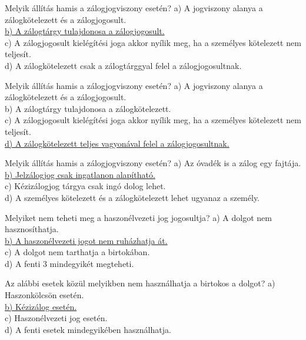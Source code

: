 \begin{frame}

\begin{tcolorbox}[title={125. Kérdés}]
Melyik állítás hamis a zálogjogviszony esetén?
\tcblower
a) A jogviszony alanya a zálogkötelezett és a zálogjogosult.\\
\uline {b) A zálogtárgy tulajdonosa a zálogjogosult.}\\
c) A zálogjogosult kielégítési joga akkor nyílik meg, ha a személyes kötelezett nem teljesít. \\
d) A zálogkötelezett csak a zálogtárggyal felel a zálogjogosultnak. 
\end{tcolorbox}

\begin{tcolorbox}[title={126. Kérdés}]
Melyik állítás hamis a zálogjogviszony esetén?
\tcblower
a) A jogviszony alanya a zálogkötelezett és a zálogjogosult.\\
b) A zálogtárgy tulajdonosa a zálogkötelezett.\\
c) A zálogjogosult kielégítési joga akkor nyílik meg, ha a személyes kötelezett nem teljesít. \\
\uline {d) A zálogkötelezett teljes vagyonával felel a zálogjogosultnak. }
\end{tcolorbox}

\begin{tcolorbox}[title={127. Kérdés}]
Melyik állítás hamis a zálogjogviszony esetén?
\tcblower
a) Az óvadék is a zálog egy fajtája.\\
\uline {b) Jelzálogjog csak ingatlanon alapítható.}\\
c) Kézizálogjog tárgya csak ingó dolog lehet.\\
d) A személyes kötelezett és a zálogkötelezett lehet ugyanaz a személy.
\end{tcolorbox}

\end{frame}


\begin{frame}

\begin{tcolorbox}[title={128. Kérdés}]
Melyiket nem teheti meg a haszonélvezeti jog jogosultja?
\tcblower
a) A dolgot nem hasznosíthatja.\\
\uline {b) A haszonélvezeti jogot nem ruházhatja át.}\\
c) A dolgot nem tarthatja a birtokában.\\
d) A fenti 3 mindegyikét megteheti.
\end{tcolorbox}

\begin{tcolorbox}[title={129. Kérdés}]
Az alábbi esetek közül melyikben nem használhatja a birtokos a dolgot?
\tcblower
a) Haszonkölcsön esetén.\\
\uline {b) Kézizálog esetén.}\\
c) Haszonélvezeti jog esetén.\\
d) A fenti esetek mindegyikében használhatja.
\end{tcolorbox}

\end{frame}

